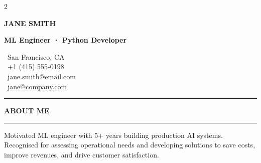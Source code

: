 \documentclass[10pt, a4paper]{cfcv}
\newcommand{\sidesection}[1]{%
  \vspace{0.40cm}%
  {\color{accent}\small\bfseries\MakeUppercase{#1}}\\[-1ex]%
  {\color{accent}\rule{\linewidth}{1.2pt}\par}\smallskip}
\begin{document}
\begin{paracol}{2}


\switchcolumn*

\color{body}
\begin{minipage}[b]{0.54\linewidth}
  {\Large\bfseries\color{black}\MakeUppercase{Jane Smith}\par}       %
  \smallskip
  {\small\bfseries\color{accent}ML Engineer · Python Developer\par}  %
\end{minipage}\hfill%
\begin{minipage}[b]{0.44\linewidth}
  \raggedleft\scriptsize\color{LightGrey}
  {\color{accent}\locationsymbol}\ San Francisco, CA\\               %
  {\color{accent}\phonesymbol}\ +1 (415) 555-0198\\                  %
  {\color{accent}\mailsymbol}\ \href{mailto:jane.smith@email.com}{jane.smith@email.com}\\ %
  {\color{accent}\mailsymbol}\ \href{mailto:jane@company.com}{jane@company.com}           %
\end{minipage}
\par\medskip
\textcolor{accent}{\rule{\linewidth}{1.2pt}}\smallskip

\switchcolumn*

\color{body}

\sidesection{About Me}
{\footnotesize\linespread{1.50}\selectfont
Motivated ML engineer with 5+ years building production AI systems.
Recognised for assessing operational needs and developing solutions
to save costs, improve revenues, and drive customer satisfaction.

}
\end{paracol}
\end{document}
